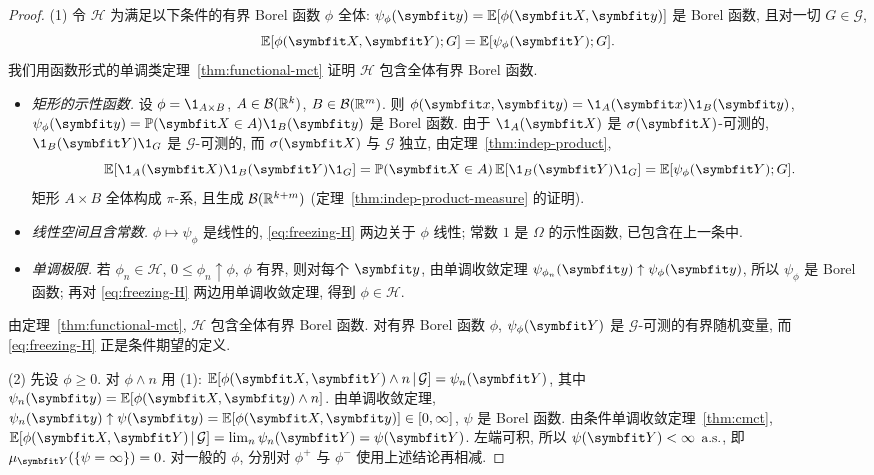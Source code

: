 \begin{proof}
(1) 令 $\mathcal{H}$ 为满足以下条件的有界 Borel 函数 $\phi$ 全体: $\psi_\phi(\rvec{y})=\E[\phi(\rvec{X},\rvec{y})]$ 是 Borel 函数, 且对一切 $G\in\mathcal{G}$,
\begin{equation}\label{eq:freezing-H}
\E[\phi(\rvec{X},\rvec{Y});G]=\E[\psi_\phi(\rvec{Y});G].
\end{equation}
我们用函数形式的单调类定理~\ref{thm:functional-mct} 证明 $\mathcal{H}$ 包含全体有界 Borel 函数.
\begin{itemize}
\item \emph{矩形的示性函数.} 设 $\phi=\1_{A\times B}$, $A\in\mathcal{B}(\mathbb{R}^k)$, $B\in\mathcal{B}(\mathbb{R}^m)$. 则 $\phi(\rvec{x},\rvec{y})=\1_A(\rvec{x})\1_B(\rvec{y})$, $\psi_\phi(\rvec{y})=\P(\rvec{X}\in A)\1_B(\rvec{y})$ 是 Borel 函数. 由于 $\1_A(\rvec{X})$ 是 $\sigma(\rvec{X})$-可测的, $\1_B(\rvec{Y})\1_G$ 是 $\mathcal{G}$-可测的, 而 $\sigma(\rvec{X})$ 与 $\mathcal{G}$ 独立, 由定理~\ref{thm:indep-product},
\[
\E[\1_A(\rvec{X})\1_B(\rvec{Y})\1_G]=\P(\rvec{X}\in A)\,\E[\1_B(\rvec{Y})\1_G]=\E[\psi_\phi(\rvec{Y});G].
\]
矩形 $A\times B$ 全体构成 $\pi$-系, 且生成 $\mathcal{B}(\mathbb{R}^{k+m})$ (定理~\ref{thm:indep-product-measure} 的证明).
\item \emph{线性空间且含常数.} $\phi\mapsto\psi_\phi$ 是线性的, \eqref{eq:freezing-H} 两边关于 $\phi$ 线性; 常数 $1$ 是 $\Omega$ 的示性函数, 已包含在上一条中.
\item \emph{单调极限.} 若 $\phi_n\in\mathcal{H}$, $0\le\phi_n\uparrow\phi$, $\phi$ 有界, 则对每个 $\rvec{y}$, 由单调收敛定理 $\psi_{\phi_n}(\rvec{y})\uparrow\psi_\phi(\rvec{y})$, 所以 $\psi_\phi$ 是 Borel 函数; 再对 \eqref{eq:freezing-H} 两边用单调收敛定理, 得到 $\phi\in\mathcal{H}$.
\end{itemize}
由定理~\ref{thm:functional-mct}, $\mathcal{H}$ 包含全体有界 Borel 函数. 对有界 Borel 函数 $\phi$, $\psi_\phi(\rvec{Y})$ 是 $\mathcal{G}$-可测的有界随机变量, 而 \eqref{eq:freezing-H} 正是条件期望的定义.

(2) 先设 $\phi\ge0$. 对 $\phi\wedge n$ 用 (1): $\E[\phi(\rvec{X},\rvec{Y})\wedge n\,|\,\mathcal{G}]=\psi_n(\rvec{Y})$, 其中 $\psi_n(\rvec{y})=\E[\phi(\rvec{X},\rvec{y})\wedge n]$. 由单调收敛定理, $\psi_n(\rvec{y})\uparrow\psi(\rvec{y})=\E[\phi(\rvec{X},\rvec{y})]\in[0,\infty]$, $\psi$ 是 Borel 函数. 由条件单调收敛定理~\ref{thm:cmct}, $\E[\phi(\rvec{X},\rvec{Y})\,|\,\mathcal{G}]=\lim_n\psi_n(\rvec{Y})=\psi(\rvec{Y})$. 左端可积, 所以 $\psi(\rvec{Y})<\infty$ $\text{a.s.}$, 即 $\mu_{\rvec{Y}}(\{\psi=\infty\})=0$. 对一般的 $\phi$, 分别对 $\phi^+$ 与 $\phi^-$ 使用上述结论再相减.
\end{proof}

